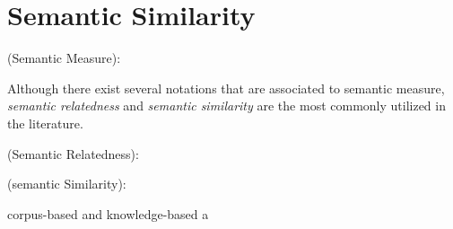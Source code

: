 \section{Semantic Similarity}  \label{cha:semantic_similarity}


\begin{definition}{(Semantic Measure):\\}

\end{definition}

Although there exist several notations that are associated to semantic measure,\textit{ semantic relatedness} and \textit{semantic similarity} are the most commonly utilized in the literature. 

\begin{definition}{(Semantic Relatedness):\\}

\end{definition}
\begin{definition}{(semantic Similarity):\\}

\end{definition}

corpus-based and knowledge-based a

